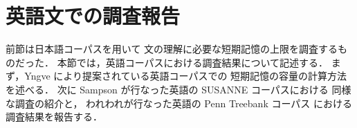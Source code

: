 \section{英語文での調査報告}

前節は日本語コーパスを用いて
文の理解に必要な短期記憶の上限を調査するものだった．
本節では，英語コーパスにおける調査結果について記述する．
まず，Yngve により提案されている英語コーパスでの
短期記憶の容量の計算方法を述べる．
次に Sampson が行なった英語の SUSANNE コーパスにおける
同様な調査\cite{Sampson97}の紹介と，
われわれが行なった英語の Penn Treebank コーパス
における調査結果を報告する．

\begin{figure}[t]
  \begin{center}
  \end{center}
\end{figure}

